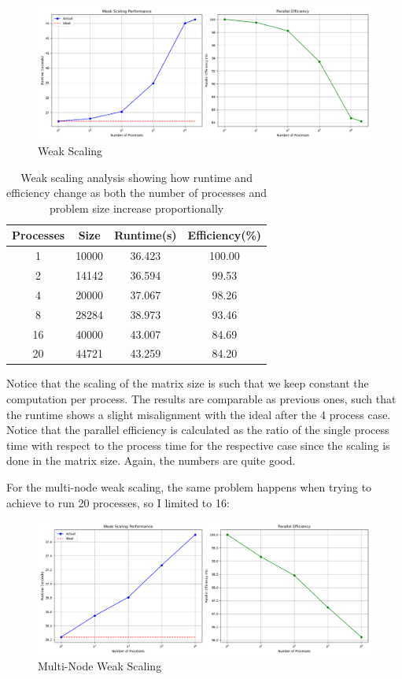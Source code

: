 \documentclass[unicode,11pt,a4paper,oneside,numbers=endperiod,openany]{scrartcl}
\begin{document}
\begin{figure}[H]
    \centering
    \includegraphics[width=\textwidth]{./img/exe4/weak_scaling.png}
    \caption{Weak Scaling}
  \end{figure}

\begin{table}[h!]
\centering
\begin{tabular}{|c|c|c|c|}
\hline
Processes & Size & Runtime(s) & Efficiency(\%) \\
\hline
1 & 10000 & 36.423 & 100.00 \\
2 & 14142 & 36.594 & 99.53 \\
4 & 20000 & 37.067 & 98.26 \\
8 & 28284 & 38.973 & 93.46 \\
16 & 40000 & 43.007 & 84.69 \\
20 & 44721 & 43.259 & 84.20 \\
\hline
\end{tabular}
\caption{Weak scaling analysis showing how runtime and efficiency change as both the number of processes and problem size increase proportionally}
\end{table}

Notice that the scaling of the matrix size is such that we keep constant the computation per process.
The results are comparable as previous ones, such that the runtime shows a slight misalignment with the ideal after the 4 process case. Notice that
the parallel efficiency is calculated as the ratio of the single process time with respect to the process time for the respective case since the scaling is 
done in the matrix size. Again, the numbers are quite good. 

For the multi-node weak scaling, the same problem happens when trying to achieve to run 20 processes, so I limited to 16:

\begin{figure}[H]
    \centering
    \includegraphics[width=\textwidth]{./img/exe4/weak_scaling_multi.png}
    \caption{Multi-Node Weak Scaling}
  \end{figure}
\end{document}
